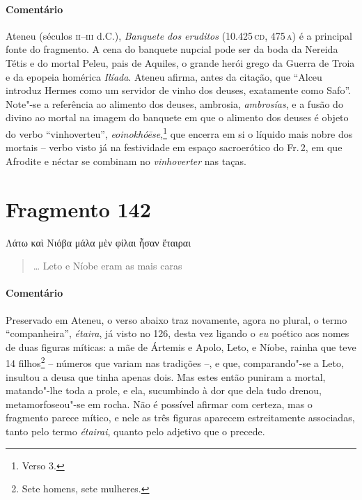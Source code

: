\paragraph{Comentário}
Ateneu (séculos \textsc{ii--iii} d.C.), \textit{Banquete dos eruditos} (10.425\,\textsc{cd}, 475\,\textsc{a}) é a principal fonte do fragmento. A cena  do  banquete nupcial pode ser da boda da Nereida Tétis e do mortal Peleu, pais de Aquiles, o grande herói grego da Guerra de Troia e da epopeia homérica \textit{Ilíada}. Ateneu afirma, antes da citação, que ``Alceu introduz Hermes como um servidor de vinho dos deuses, exatamente como Safo''. Note"-se a referência ao alimento dos deuses, ambrosia, \textit{ambrosías}, e a fusão do divino ao mortal na imagem do banquete em que o alimento dos deuses é objeto do verbo ``vinhoverteu'', \textit{eoinokhóēse},\footnote{Verso 3.} que encerra em si o líquido mais nobre dos mortais -- verbo visto já na festividade em espaço sacroerótico do Fr.\,2, em que Afrodite e néctar se combinam no \textit{vinhoverter} nas taças.


\pagebreak
\section{Fragmento 142}

\begin{gkverse}
Λάτω καὶ Νιόβα μάλα μὲν φίλαι ἦσαν ἔταιραι
\end{gkverse}

\begin{verse}
\ldots{} Leto e Níobe eram as mais caras 
\end{verse}

\medskip

{\paragraph{Comentário} Preservado em Ateneu, o verso abaixo traz novamente,
agora no plural, o termo ``companheira'', \textit{étaira}, já visto no
126, desta vez ligando o \textit{eu} poético aos nomes de duas figuras míticas: a mãe de
Ártemis e Apolo, Leto, e Níobe, rainha que teve 14 filhos\footnote{Sete homens, sete
mulheres.} -- números que variam nas tradições --, e que, comparando"-se a Leto, insultou a deusa que tinha apenas dois.
Mas estes então puniram a mortal, matando"-lhe toda a prole, e ela, sucumbindo à dor que dela tudo drenou, metamorfoseou"-se em rocha. Não é possível afirmar
com certeza, mas o fragmento parece mítico, e nele as três figuras aparecem
estreitamente associadas, tanto pelo termo \textit{étairai}, quanto pelo
adjetivo que o precede.}



